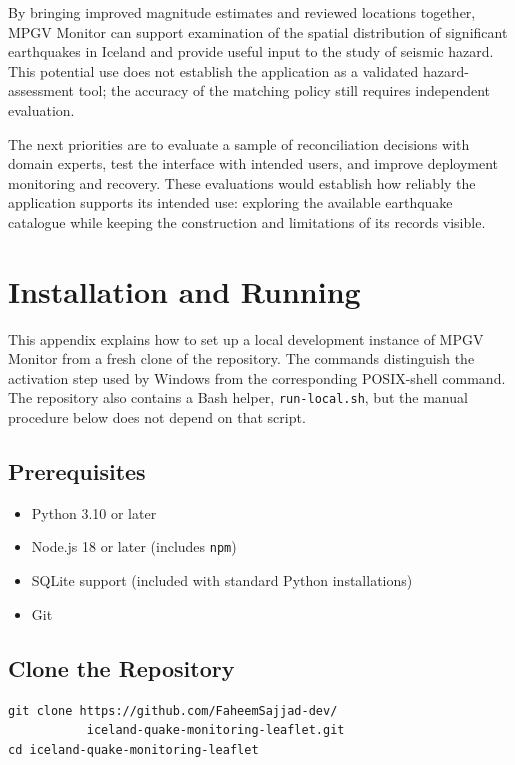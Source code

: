 \documentclass[12pt]{article}
\begin{document}
By bringing improved magnitude estimates and reviewed locations together, MPGV Monitor can support examination of the spatial distribution of significant earthquakes in Iceland and provide useful input to the study of seismic hazard. This potential use does not establish the application as a validated hazard-assessment tool; the accuracy of the matching policy still requires independent evaluation.

The next priorities are to evaluate a sample of reconciliation decisions with domain experts, test the interface with intended users, and improve deployment monitoring and recovery. These evaluations would establish how reliably the application supports its intended use: exploring the available earthquake catalogue while keeping the construction and limitations of its records visible.

\clearpage
\appendix
\section{Installation and Running}
\label{app:installation}

This appendix explains how to set up a local development instance of MPGV Monitor from a fresh clone of the repository. The commands distinguish the activation step used by Windows from the corresponding POSIX-shell command. The repository also contains a Bash helper, \texttt{run-local.sh}, but the manual procedure below does not depend on that script.

\subsection*{Prerequisites}

\begin{itemize}
    \item Python 3.10 or later
    \item Node.js 18 or later (includes \texttt{npm})
    \item SQLite support (included with standard Python installations)
    \item Git
\end{itemize}

\subsection*{Clone the Repository}

\begin{verbatim}
git clone https://github.com/FaheemSajjad-dev/
           iceland-quake-monitoring-leaflet.git
cd iceland-quake-monitoring-leaflet
\end{verbatim}
\end{document}
